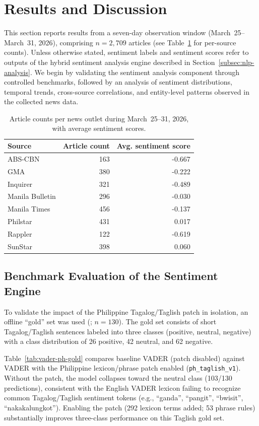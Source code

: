 \documentclass[sigconf, nonacm]{acmart}
\begin{document}
\section{Results and Discussion}
\label{sec:results}
This section reports results from a seven-day observation window (March~25--March~31, 2026), comprising $n=2{,}709$ articles (see Table~\ref{tab:per-source-counts} for per-source counts). Unless otherwise stated, sentiment labels and sentiment scores refer to outputs of the hybrid sentiment analysis engine described in Section~\ref{subsec:nlp-analysis}.
We begin by validating the sentiment analysis component through controlled benchmarks, followed by an analysis of sentiment distributions, temporal trends, cross-source correlations, and entity-level patterns observed in the collected news data.

\begin{table}[h]
\centering
\small
\caption{Article counts per news outlet during March~25--31, 2026, with average sentiment scores.}
\label{tab:per-source-counts}
\begin{tabular}{lrr}
\toprule
Source & Article count & Avg. sentiment score \\
\midrule
ABS-CBN         & 163 & -0.667 \\
GMA             & 380 & -0.222 \\
Inquirer        & 321 & -0.489 \\
Manila Bulletin & 296 & -0.030 \\
Manila Times    & 456 & -0.137 \\
Philstar        & 431 & 0.017 \\
Rappler         & 122 & -0.619 \\
SunStar         & 398 & 0.060 \\
\bottomrule
\end{tabular}
\end{table}

\subsection{Benchmark Evaluation of the Sentiment Engine}
To validate the impact of the Philippine Tagalog/Taglish patch in isolation, an offline ``gold'' set was used (; $n=130$). The gold set consists of short Tagalog/Taglish sentences labeled into three classes (positive, neutral, negative) with a class distribution of 26 positive, 42 neutral, and 62 negative.

Table~\ref{tab:vader-ph-gold} compares baseline VADER (patch disabled) against VADER with the Philippine lexicon/phrase patch enabled (\texttt{ph\_taglish\_v1}). Without the patch, the model collapses toward the neutral class (103/130 predictions), consistent with the English VADER lexicon failing to recognize common Tagalog/Taglish sentiment tokens (e.g., ``ganda'', ``pangit'', ``bwisit'', ``nakakalungkot''). Enabling the patch (292 lexicon terms added; 53 phrase rules) substantially improves three-class performance on this Taglish gold set.
\end{document}
